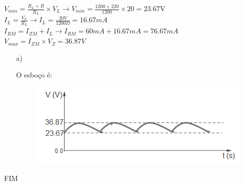 \documentclass[11pt,a4paper,twoside]{report}
\begin{document}
\begin{enumerate}
$V_{min}=\frac{R_L+R}{R_L}\times V_L \longrightarrow V_{min}=\frac{1200+220}{1200}\times 20=23.67 $V\\
\vspace{0.3cm}
$I_L=\frac{V_L}{R_L}\longrightarrow I_L=\frac{20V}{1200\Omega}=16.67mA$\\
\vspace{0.3cm}
$I_{RM}=I_{ZM}+I_L \longrightarrow I_{RM}=60 mA+16.67mA=76.67mA$\\
\vspace{0.3cm}
$V_{max}=I_{ZM}\times V_Z=36.87V$\\

\begin{enumerate}
\item[a)]

O esbo\c co \'e: 
\begin{figure}[H]
\centering
\includegraphics[scale=1]{ripple}
\caption{}
\label{f1}
\end{figure}
\end{enumerate}


\end{enumerate}



\Huge FIM
\end{document}
